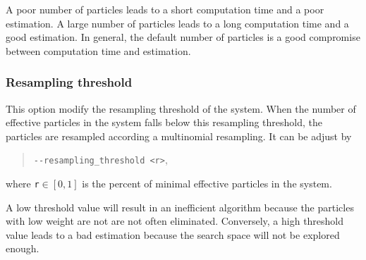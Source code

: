         A poor number of particles leads to a short computation time and a poor estimation. A large number of particles leads to a long computation time and a good estimation. In general, the default number of particles is a good compromise between computation time and estimation.


    \subsubsection*{Resampling threshold}
        This option modify the resampling threshold of the system. When the number of effective particles in the system falls below this resampling threshold, the particles are resampled according a multinomial resampling. It can be adjust by
            \begin{quote}
                \texttt{-\hspace{0.1mm}-resampling\_threshold <r>},
            \end{quote}
        where \texttt{r}$\in[0,1]$ is the percent of minimal effective particles in the system.

        A low threshold value will result in an inefficient algorithm because the particles with low weight are not are not often eliminated. Conversely, a high threshold value leads to a bad estimation because the search space will not be explored enough.
